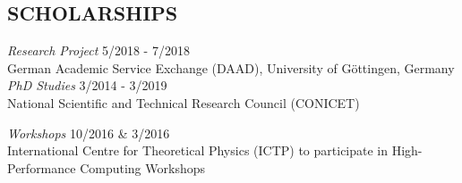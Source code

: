 \documentclass[margin]{res}
\begin{document}
\begin{resume}
\section{SCHOLARSHIPS}  {\sl Research Project} 
	\hfill  5/2018 - 7/2018 \\
	German Academic Service Exchange
	(DAAD), University of G\"ottingen, Germany \\

	{\sl PhD Studies} \hfill  3/2014 - 3/2019 \\
	National Scientific and Technical Research Council (CONICET)
	
	{\sl Workshops} \hfill { 10/2016 \& 3/2016} \\
	International Centre for Theoretical Physics (ICTP) 
	to participate in High-Performance Computing Workshops



\end{resume}
\end{document}
